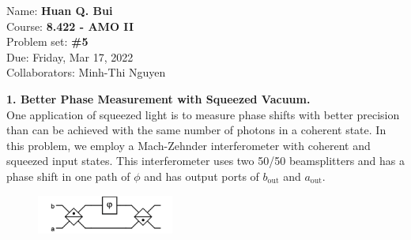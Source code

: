 \documentclass{article}
\theoremstyle{definition}
\begin{document}
\begin{framed}
\noindent Name: \textbf{Huan Q. Bui}\\
Course: \textbf{8.422 - AMO II}\\
Problem set: \textbf{\#5}\\
Due: Friday, Mar 17, 2022\\
Collaborators: Minh-Thi Nguyen 
\end{framed}
	


\noindent \textbf{1. Better Phase Measurement with Squeezed Vacuum.}\\

\noindent One application of squeezed light is to measure phase shifts with better precision than can be
achieved with the same number of photons in a coherent state.  In this problem, we employ a
Mach-Zehnder interferometer with coherent and squeezed input states. This interferometer uses two 50/50 beamsplitters and has a phase shift in one path of $\phi$ and has output ports of $b_\text{out}$ and $a_\text{out}$. 

\begin{figure}[!htb]
\centering
\includegraphics[width=0.4\textwidth]{figures/BS.png}
\end{figure}
\end{document}
